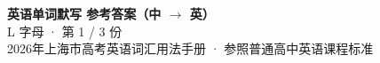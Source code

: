 \documentclass[10pt,a4paper]{article}
\begin{document}
\pagestyle{plain}

\begin{center}
{\LARGE\bfseries 英语单词默写 \quad 参考答案（中 $\to$ 英）}\\[0.22em]
{\large L 字母 · 第 1 / 3 份}\\[0.18em]
{\small 2026年上海市高考英语词汇用法手册 · 参照普通高中英语课程标准}
\end{center}

\vspace{0.2em}
\noindent{\color{rulegray}\rule{\textwidth}{0.8pt}}

\vspace{0.35em}

\vspace{0.25em}
\renewcommand{\arraystretch}{1.32}
\end{document}
